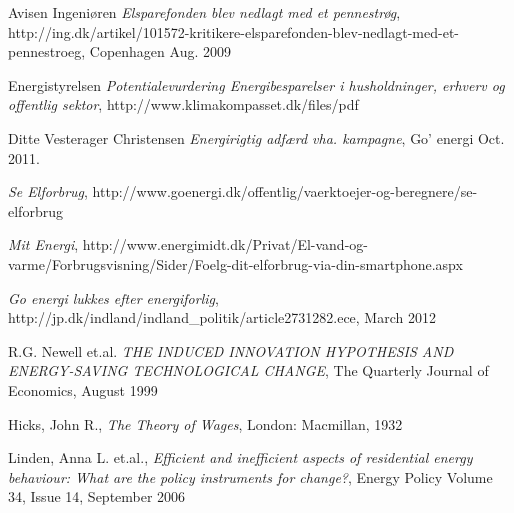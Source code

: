 \documentclass[journal]{IEEEtran}
\begin{document}
\begin{thebibliography}{1}
Avisen Ingeniøren \emph{Elsparefonden blev nedlagt med et pennestrøg}, \relax 
http://ing.dk/artikel/101572-kritikere-elsparefonden-blev-nedlagt-med-et-pennestroeg, Copenhagen Aug. 2009

Energistyrelsen \emph{Potentialevurdering Energibesparelser i husholdninger, erhverv og offentlig sektor}, \relax http://www.klimakompasset.dk/files/pdf


Ditte Vesterager Christensen \emph{Energirigtig adfærd vha. kampagne}, \relax Go' energi Oct. 2011.

\emph{Se Elforbrug}, \relax http://www.goenergi.dk/offentlig/vaerktoejer-og-beregnere/se-elforbrug

\emph{Mit Energi}, \relax 
http://www.energimidt.dk/Privat/El-vand-og-varme/Forbrugsvisning/Sider/Foelg-dit-elforbrug-via-din-smartphone.aspx 

\emph{Go energi lukkes efter energiforlig}, \relax
http://jp.dk/indland/indland\_politik/article2731282.ece, March 2012

R.G. Newell et.al. \emph{THE INDUCED INNOVATION HYPOTHESIS AND ENERGY-SAVING TECHNOLOGICAL CHANGE}, \relax The Quarterly Journal of Economics, August 1999

Hicks, John R., \emph{The Theory of Wages}, \relax London: Macmillan, 1932

Linden, Anna L. et.al., \emph{Efficient and inefficient aspects of residential energy behaviour: What are the policy instruments for change?}, \relax Energy Policy
Volume 34, Issue 14, September 2006


\end{thebibliography}




\end{document}
